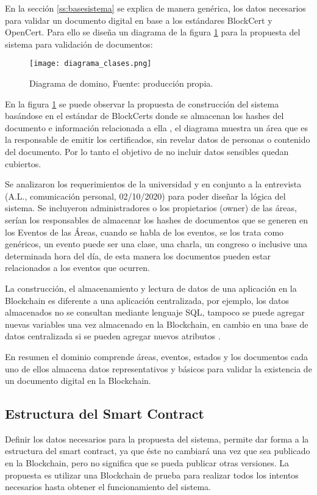 En la sección \ref{ss:basesistema}  se explica de manera genérica, los datos necesarios 
para validar un documento digital en base a los estándares BlockCert y OpenCert.
Para ello se diseña un diagrama de la figura \ref{img:diagrama_clases} para la propuesta del sistema para validación de documentos:  

\begin{figure}[H]
    \centering
    {\texttt{[image: diagrama\_clases.png]}}
    \caption{Diagrama de domino, Fuente: producción propia.}
    \label{img:diagrama_clases}
  \end{figure}

  En la figura \ref{img:diagrama_clases} se puede observar la propuesta de  construcción del sistema basándose 
  en el estándar de BlockCerts donde se almacenan los hashes del documento e información relacionada a ella \cite[]{blockcerts_introduction_nodate,criptomonedas_tv_entrevista_2018,blockcerts_faq_nodate}, 
  el diagrama muestra un área que es la responsable 
  de emitir los certificados, sin revelar datos de personas o contenido del documento. Por lo tanto el objetivo
  de no incluir  datos sensibles quedan cubiertos. 

  Se analizaron los requerimientos de la universidad y en conjunto a la entrevista (A.L., comunicación personal, 02/10/2020) para poder diseñar la lógica del sistema. Se incluyeron administradores o los propietarios (owner) 
  de las áreas, serían los responsables de almacenar los hashes de  documentos que se generen en los Eventos de las Áreas,
  cuando se habla de los eventos, se los trata como  genéricos, un evento puede ser una clase, una charla, un congreso o inclusive
  una determinada hora del día, de esta manera los documentos pueden estar relacionados a los eventos que ocurren.

  La construcción, el almacenamiento  y lectura  de datos de una aplicación  en la  Blockchain es diferente a una 
  aplicación centralizada, por ejemplo, los datos almacenados no se consultan mediante lenguaje SQL, tampoco se puede agregar nuevas
  variables una vez almacenado en la Blockchain, en cambio en una base de datos centralizada si se pueden agregar nuevos atributos \cite[]{dannen_introducing_2017,mayor_Blockchain_2017}.

 En resumen el dominio comprende áreas, eventos, estados y los documentos cada uno de ellos
 almacena datos representativos y básicos para validar la existencia de un documento digital en la Blockchain. 

  \subsection{Estructura del Smart Contract}
  Definir  los datos necesarios para la propuesta del sistema, permite dar forma a 
  la estructura del smart contract, ya que éste no cambiará una vez que sea publicado en la Blockchain, pero no significa
  que se pueda publicar otras versiones. La propuesta es utilizar una  Blockchain de prueba  para realizar todos los intentos necesarios 
  hasta obtener el funcionamiento del sistema. 

